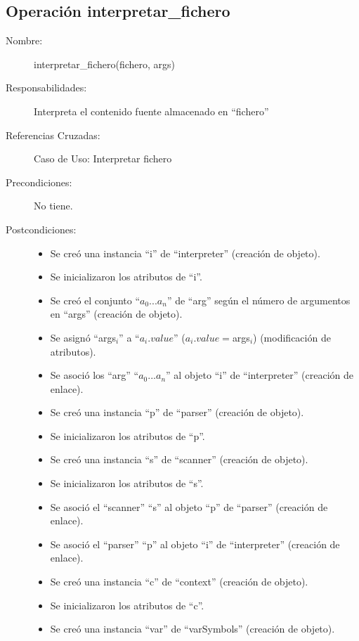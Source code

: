 \subsection{Operación interpretar\_fichero}
\FloatBarrier
\begin{framed}
	\begin{description}
		\item [Nombre:] interpretar\_fichero(fichero, args)
		\item [Responsabilidades:] Interpreta el contenido fuente almacenado en ``fichero''
		\item [Referencias Cruzadas: ] Caso de Uso: Interpretar fichero
      \item [Precondiciones:] No tiene.
      \item [Postcondiciones:] \hfill
      \begin {itemize}
         \item Se creó una instancia ``i'' de ``interpreter'' (creación de objeto).
         \item Se inicializaron los atributos de ``i''.
         \item Se creó el conjunto ``$a_0...a_n$'' de ``arg'' según el número de argumentos en ``args'' (creación de objeto).
         \item Se asignó ``args$_i$'' a ``$a_i.value$'' ($a_i.value = $args$_i$) (modificación de atributos).
         \item Se asoció los ``arg'' ``$a_0...a_n$'' al objeto ``i'' de ``interpreter'' (creación de enlace).
         \item Se creó una instancia ``p'' de ``parser'' (creación de objeto).
         \item Se inicializaron los atributos de ``p''.
         \item Se creó una instancia ``s'' de ``scanner'' (creación de objeto).
         \item Se inicializaron los atributos de ``s''.
         \item Se asoció el ``scanner'' ``s'' al objeto ``p'' de ``parser'' (creación de enlace).
         \item Se asoció el ``parser'' ``p'' al objeto ``i'' de ``interpreter'' (creación de enlace).
         \item Se creó una instancia ``c'' de ``context'' (creación de objeto).
         \item Se inicializaron los atributos de ``c''.
         \item Se creó una instancia ``var'' de ``varSymbols'' (creación de objeto).

\end{itemize}
\end{description}
\end{framed}
